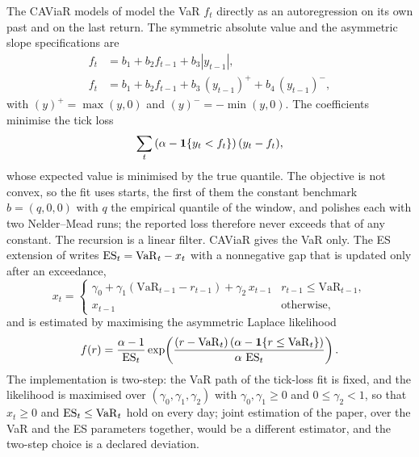 The CAViaR models of \citet{market:engleManganelli2004} model the VaR $f_t$ directly as an autoregression on its own past and on the
last return. The symmetric absolute value and the asymmetric slope specifications are
\begin{align}
f_t&=b_1+b_2f_{t-1}+b_3|y_{t-1}|, \label{eq:mk-sav}\\
f_t&=b_1+b_2f_{t-1}+b_3\,(y_{t-1})^{+}+b_4\,(y_{t-1})^{-}, \label{eq:mk-as}
\end{align}
with $(y)^+=\max(y,0)$ and $(y)^-=-\min(y,0)$. The coefficients minimise the tick loss
\begin{equation}
\sum_t\left(\alpha-\mathbf{1}\{y_t<f_t\}\right)(y_t-f_t),
\label{eq:mk-tick}
\end{equation}
whose expected value is minimised by the true quantile. The objective is not convex, so the fit uses \mkCaviarStarts{} starts, the
first of them the constant benchmark $b=(q,0,0)$ with $q$ the empirical quantile of the window, and polishes each with two
Nelder--Mead runs; the reported loss therefore never exceeds that of any constant. The recursion is a linear filter. CAViaR gives the VaR
only. The ES extension of \citet{market:taylor2019} writes $\operatorname{ES}_t=\mathrm{VaR}_t-x_t$ with a nonnegative gap that is updated only
after an exceedance,
\begin{equation}
x_t=\begin{cases}\gamma_0+\gamma_1\left(\mathrm{VaR}_{t-1}-r_{t-1}\right)+\gamma_2\,x_{t-1}&r_{t-1}\le\mathrm{VaR}_{t-1},\\x_{t-1}&\text{otherwise},\end{cases}
\label{eq:mk-escaviar}
\end{equation}
and is estimated by maximising the asymmetric Laplace likelihood \citep{market:taylor2019,market:liuluger2026}
\begin{equation}
f(r)=\frac{\alpha-1}{\operatorname{ES}_t}\exp\!\left(\frac{(r-\mathrm{VaR}_t)\left(\alpha-\mathbf{1}\{r\le\mathrm{VaR}_t\}\right)}{\alpha\,\operatorname{ES}_t}\right).
\label{eq:mk-ald}
\end{equation}
The implementation is two-step: the VaR path of the tick-loss fit is fixed, and the likelihood is maximised over $(\gamma_0,\gamma_1,\gamma_2)$ with
$\gamma_0,\gamma_1\ge0$ and $0\le\gamma_2<1$, so that $x_t\ge0$ and $\operatorname{ES}_t\le\mathrm{VaR}_t$ hold on every day; joint estimation of the
paper, over the VaR and the ES parameters together, would be a different estimator, and the two-step choice is a declared deviation.

